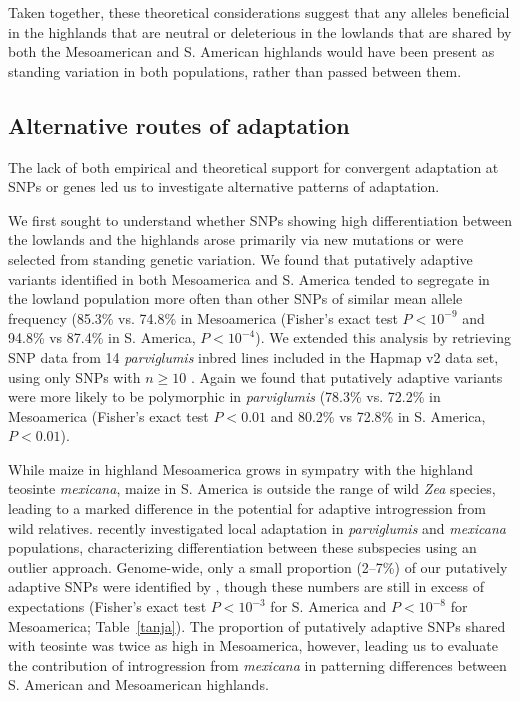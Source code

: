 Taken together, these theoretical considerations suggest that any alleles beneficial in the highlands that are neutral or deleterious in the lowlands that are shared by both the Mesoamerican and S. American highlands would have been present as standing variation in both populations, rather than passed between them.


\subsection*{Alternative routes of adaptation}
The lack of both empirical and theoretical support for convergent adaptation at SNPs or genes led us to investigate alternative patterns of adaptation. 

We first sought to understand whether SNPs showing high differentiation between the lowlands and the highlands arose primarily via new mutations or were selected from standing genetic variation.  
We found that putatively adaptive variants identified in both Mesoamerica and S. America tended to segregate in the lowland population more often than other SNPs of similar mean allele frequency (85.3\% vs. 74.8\% in Mesoamerica (Fisher's exact test $P < 10^{-9}$ and 94.8\% vs 87.4\% in S. America,  $P< 10^{-4}$).  
We extended this analysis by retrieving SNP data from 14 \emph{parviglumis} inbred lines included in the Hapmap v2 data set, using only SNPs with $n\geq10$ \cite[]{Chia_2012_22660545,Hufford_2012_22660546}.  
Again we found that putatively adaptive variants were more likely to be polymorphic in \emph{parviglumis} (78.3\% vs. 72.2\% in Mesoamerica 
(Fisher's exact test $P < 0.01$ and 80.2\% vs 72.8\% in S. America,  $P< 0.01$). 

While maize in highland Mesoamerica grows in sympatry with the highland teosinte \textit{mexicana}, maize in S. America is outside the range of wild \textit{Zea} species, leading to a marked difference in the potential for adaptive introgression from wild relatives.
\citet{Pyhajarvi2013} recently investigated local adaptation in \textit{parviglumis} and \textit{mexicana} populations, characterizing differentiation between these subspecies using an outlier approach.
Genome-wide, only a small proportion (2--7\%) of our putatively adaptive SNPs were identified by \citet{Pyhajarvi2013}, though these numbers are still in excess of expectations (Fisher's exact test $P<10^{-3}$ for S. America and $P<10^{-8}$ for Mesoamerica; Table~\ref{tanja}).
The proportion of putatively adaptive SNPs shared with teosinte was twice as high in Mesoamerica, however, 
leading us to evaluate the contribution of introgression  from \textit{mexicana} \cite[]{Profford_2013} in patterning differences between S. American and Mesoamerican highlands.  

